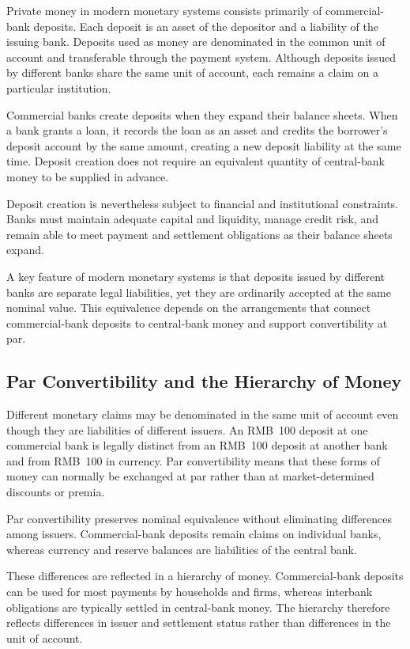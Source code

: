 Private money in modern monetary systems consists primarily of commercial-bank deposits. Each deposit is an asset of the depositor and a liability of the issuing bank. Deposits used as money are denominated in the common unit of account and transferable through the payment system. Although deposits issued by different banks share the same unit of account, each remains a claim on a particular institution.

Commercial banks create deposits when they expand their balance sheets. When a bank grants a loan, it records the loan as an asset and credits the borrower's deposit account by the same amount, creating a new deposit liability at the same time. Deposit creation does not require an equivalent quantity of central-bank money to be supplied in advance.

Deposit creation is nevertheless subject to financial and institutional constraints. Banks must maintain adequate capital and liquidity, manage credit risk, and remain able to meet payment and settlement obligations as their balance sheets expand.

A key feature of modern monetary systems is that deposits issued by different banks are separate legal liabilities, yet they are ordinarily accepted at the same nominal value. This equivalence depends on the arrangements that connect commercial-bank deposits to central-bank money and support convertibility at par.

\subsection{Par Convertibility and the Hierarchy of Money}

Different monetary claims may be denominated in the same unit of account even though they are liabilities of different issuers. An RMB~100 deposit at one commercial bank is legally distinct from an RMB~100 deposit at another bank and from RMB~100 in currency. Par convertibility means that these forms of money can normally be exchanged at par rather than at market-determined discounts or premia.

Par convertibility preserves nominal equivalence without eliminating differences among issuers. Commercial-bank deposits remain claims on individual banks, whereas currency and reserve balances are liabilities of the central bank. 

These differences are reflected in a hierarchy of money. Commercial-bank deposits can be used for most payments by households and firms, whereas interbank obligations are typically settled in central-bank money. The hierarchy therefore reflects differences in issuer and settlement status rather than differences in the unit of account.


